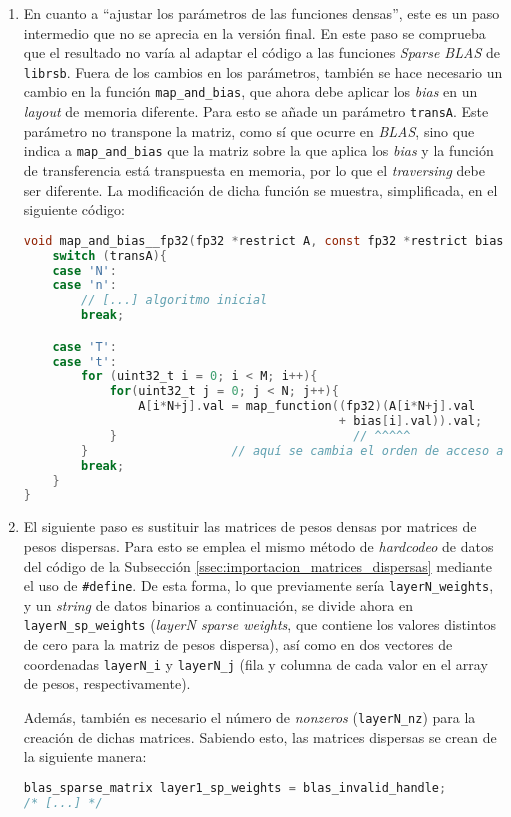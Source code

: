 \begin{enumerate}
    \item En cuanto a ``ajustar los parámetros de las funciones densas'', este es un paso intermedio que no se aprecia en la versión final. En este paso se comprueba que el resultado no varía al adaptar el código a las funciones \textit{Sparse BLAS} de \texttt{librsb}. Fuera de los cambios en los parámetros, también se hace necesario un cambio en la función \texttt{map\_and\_bias}, que ahora debe aplicar los \textit{bias} en un \textit{layout} de memoria diferente. Para esto se añade un parámetro \texttt{transA}. Este parámetro no transpone la matriz, como sí que ocurre en \textit{BLAS}, sino que indica a \texttt{map\_and\_bias} que la matriz sobre la que aplica los \textit{bias} y la función de transferencia está transpuesta en memoria, por lo que el \textit{traversing} debe ser diferente. La modificación de dicha función se muestra, simplificada, en el siguiente código:\medskip
\begin{lstlisting}[language=C]
void map_and_bias__fp32(fp32 *restrict A, const fp32 *restrict bias, const uint32_t M, const uint32_t N, const char transA, fp32 (* map_function)(fp32 x)){
    switch (transA){
    case 'N':
    case 'n':
        // [...] algoritmo inicial
        break;

    case 'T':
    case 't':
        for (uint32_t i = 0; i < M; i++){
            for(uint32_t j = 0; j < N; j++){
                A[i*N+j].val = map_function((fp32)(A[i*N+j].val 
                                            + bias[i].val)).val;
            }                                 // ^^^^^
        }                    // aquí se cambia el orden de acceso a bias
        break;
    }
}
\end{lstlisting}

    \item El siguiente paso es sustituir las matrices de pesos densas por matrices de pesos dispersas. Para esto se emplea el mismo método de \textit{hardcodeo} de datos del código de la Subsección \ref{ssec:importacion_matrices_dispersas} mediante el uso de \texttt{\#define}. De esta forma, lo que previamente sería \texttt{layerN\_weights}, y un \textit{string} de datos binarios a continuación, se divide ahora en \texttt{layerN\_sp\_weights} (\textit{layerN sparse weights}, que contiene los valores distintos de cero para la matriz de pesos dispersa), así como en dos vectores de coordenadas \texttt{layerN\_i} y \texttt{layerN\_j} (fila y columna de cada valor en el array de pesos, respectivamente).
    
    Además, también es necesario el número de \textit{nonzeros} (\texttt{layerN\_nz}) para la creación de dichas matrices. Sabiendo esto, las matrices dispersas se crean de la siguiente manera:\medskip
\begin{lstlisting}[language=C]
blas_sparse_matrix layer1_sp_weights = blas_invalid_handle;
/* [...] */


\end{lstlisting}
\end{enumerate}
